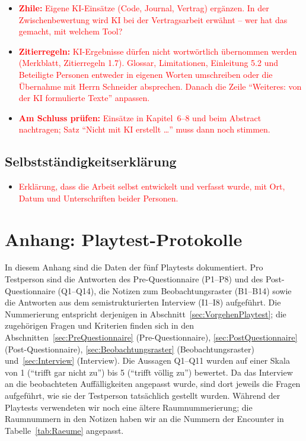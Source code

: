 \documentclass[../Main.tex]{subfiles}
\begin{document}
\begin{itemize}[leftmargin=1.5cm]
    \item \textcolor{red}{\textbf{Zhile:} Eigene KI-Einsätze (Code, Journal, Vertrag) ergänzen. In der Zwischenbewertung wird KI bei der Vertragsarbeit erwähnt -- wer hat das gemacht, mit welchem Tool?}
    \item \textcolor{red}{\textbf{Zitierregeln:} KI-Ergebnisse dürfen nicht wortwörtlich übernommen werden (Merkblatt, Zitierregeln 1.7). Glossar, Limitationen, Einleitung 5.2 und Beteiligte Personen entweder in eigenen Worten umschreiben oder die Übernahme mit Herrn Schneider absprechen. Danach die Zeile \enquote{Weiteres: von der KI formulierte Texte} anpassen.}
    \item \textcolor{red}{\textbf{Am Schluss prüfen:} Einsätze in Kapitel~6--8 und beim Abstract nachtragen; Satz \enquote{Nicht mit KI erstellt \ldots} muss dann noch stimmen.}
\end{itemize}

\subsection{Selbstständigkeitserklärung}

\begin{itemize}[leftmargin=1.5cm]
    \item \textcolor{red}{Erklärung, dass die Arbeit selbst entwickelt und verfasst wurde, mit Ort, Datum und Unterschriften beider Personen.}
\end{itemize}

\newpage
{}
\section{Anhang: Playtest-Protokolle} \label{sec:PlaytestProtokolle}

In diesem Anhang sind die Daten der fünf Playtests dokumentiert. Pro Testperson sind die Antworten des Pre-Questionnaire (P1--P8) und des Post-Questionnaire (Q1--Q14), die Notizen zum Beobachtungsraster (B1--B14) sowie die Antworten aus dem semistrukturierten Interview (I1--I8) aufgeführt. Die Nummerierung entspricht derjenigen in Abschnitt~\ref{sec:VorgehenPlaytest}; die zugehörigen Fragen und Kriterien finden sich in den Abschnitten~\ref{sec:PreQuestionnaire} (Pre-Questionnaire), \ref{sec:PostQuestionnaire} (Post-Questionnaire), \ref{sec:Beobachtungsraster} (Beobachtungsraster) und~\ref{sec:Interview} (Interview). Die Aussagen Q1--Q11 wurden auf einer Skala von 1 (\enquote{trifft gar nicht zu}) bis 5 (\enquote{trifft völlig zu}) bewertet. Da das Interview an die beobachteten Auffälligkeiten angepasst wurde, sind dort jeweils die Fragen aufgeführt, wie sie der Testperson tatsächlich gestellt wurden. Während der Playtests verwendeten wir noch eine ältere Raumnummerierung; die Raumnummern in den Notizen haben wir an die Nummern der Encounter in Tabelle~\ref{tab:Raeume} angepasst.
\end{document}
